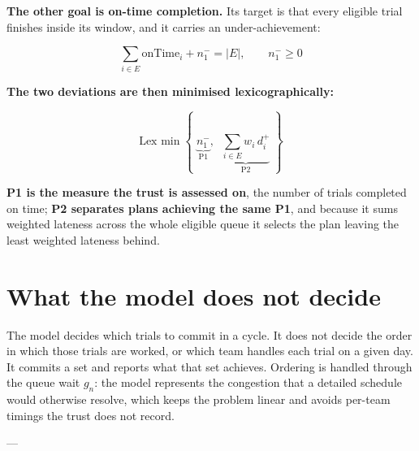 \textbf{The other goal is on-time completion.} Its target is that every eligible trial finishes inside its window, and it carries an under-achievement:

\begin{equation}
  \sum_{i \in E} \mathrm{onTime}_i + n_1^- = |E|, \qquad n_1^- \ge 0
  \label{eq:ontimecount}
\end{equation}

\textbf{The two deviations are then minimised lexicographically:}

\begin{equation}
  \text{Lex min}\;\left\{\; \underbrace{n_1^-}_{\text{P1}},\;\; \underbrace{\sum_{i \in E} w_i\, d^+_i}_{\text{P2}} \;\right\}
  \label{eq:objectives}
\end{equation}

\textbf{P1 is the measure the trust is assessed on}, the number of trials completed on time; \textbf{P2 separates plans achieving the same P1}, and because it sums weighted lateness across the whole eligible queue it selects the plan leaving the least weighted lateness behind.

\section{What the model does not decide}
\label{sec:notdecided}

The model decides which trials to commit in a cycle. It does not decide the order in which those trials are worked, or which team handles each trial on a given day. It commits a set and reports what that set achieves. Ordering is handled through the queue wait $g_n$: the model represents the congestion that a detailed schedule would otherwise resolve, which keeps the problem linear and avoids per-team timings the trust does not record.

---

